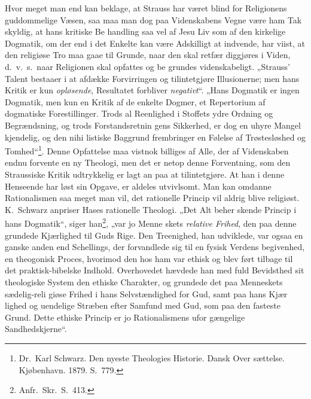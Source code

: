 \documentclass[12pt,a4paper]{article}
\newcommand{\opage}[1]{\marginnote{\footnotesize\textit{[#1]}}}
\begin{document}
Hvor meget man end kan beklage, at Strauss har været
blind for Religionens guddommelige Væsen, saa maa man dog paa
Videnskabens Vegne være ham Tak skyldig, at hans kritiske Be\-%
handling saa vel af Jesu Liv som af den kirkelige Dogmatik, om
der end i det Enkelte kan være Adskilligt at indvende, har viist,
at den religiøse Tro maa gaae til Grunde, naar den skal retfær\-%
diggjøres i Viden, d.\ v.\ s.\ naar Religionen skal opfattes og be\-%
grundes videnskabeligt. „Strauss' Talent bestaaer i at afdække
\opage{32}Forvirringen og tilintetgjøre Illusionerne; men hans Kritik er kun
\emph{opløsende}, Resultatet forbliver \emph{negativt}“. „Hans Dogmatik
er ingen Dogmatik, men kun en Kritik af de enkelte Dogmer, et
Repertorium af dogmatiske Forestillinger. Trods al Reenlighed i
Stoffets ydre Ordning og Begrændsning, og trods Forstandsretnin\-%
gens Sikkerhed, er dog en uhyre Mangel kjendelig, og den nihi\-%
listiske Baggrund frembringer en Følelse af Trøstesløshed og
Tomhed“\footnote{Dr.\ Karl Schwarz. Den nyeste Theologies Historie. Dansk Over\-%
sættelse. Kjøbenhavn. 1879. S.\ 779.}. %
Denne Opfattelse maa vistnok billiges af Alle, der
af Videnskaben endnu forvente en ny Theologi, men det er netop
denne Forventning, som den Straussiske Kritik udtrykkelig er lagt
an paa at tilintetgjøre. At han i denne Henseende har løst sin
Opgave, er aldeles utvivlsomt. Man kan omdanne Rationalismen
saa meget man vil, det rationelle Princip vil aldrig blive religiøst.
K.\ Schwarz anpriser Hases rationelle Theologi. „Det Alt beher\-%
skende Princip i hans Dogmatik“, siger han\footnote{Anfr.\ Skr.\ S.\ 413.}, %
„var jo Menne\-%
skets \emph{relative Frihed}, den paa denne grundede Kjærlighed
til Guds Rige. Den Treenighed, han udviklede, var ogsaa en ganske
anden end Schellings, der forvandlede sig til en fysisk Verdens\-%
begivenhed, en theogonisk Proces, hvorimod den hos ham var ethisk
og blev ført tilbage til det praktisk-bibelske Indhold. Overhovedet
hævdede han med fuld Bevidsthed sit theologiske System den
ethiske Charakter, og grundede det paa Menneskets sædelig-reli\-%
giøse Frihed i hans Selvstændighed for Gud, samt paa hans Kjær\-%
lighed og uendelige Stræben efter Samfund med Gud, som paa den
fasteste Grund. Dette ethiske Princip er jo Rationalismens ufor\-%
gængelige Sandhedskjerne“.
\end{document}
